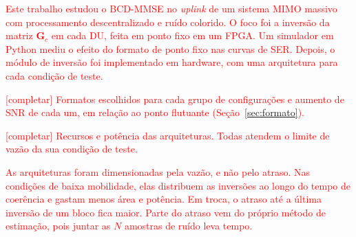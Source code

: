 
\textcolor{red}{Este trabalho estudou o BCD-MMSE no \textit{uplink} de um sistema MIMO massivo com processamento descentralizado e ruído colorido. O foco foi a inversão da matriz $\mathbf G_c$ em cada DU, feita em ponto fixo em um FPGA. Um simulador em Python mediu o efeito do formato de ponto fixo nas curvas de SER. Depois, o módulo de inversão foi implementado em hardware, com uma arquitetura para cada condição de teste.}

\textcolor{red}{[completar] Formatos escolhidos para cada grupo de configurações e aumento de SNR de cada um, em relação ao ponto flutuante (Seção~\ref{sec:formato}).}

\textcolor{red}{[completar] Recursos e potência das arquiteturas. Todas atendem o limite de vazão da sua condição de teste.}

\textcolor{red}{As arquiteturas foram dimensionadas pela vazão, e não pelo atraso. Nas condições de baixa mobilidade, elas distribuem as inversões ao longo do tempo de coerência e gastam menos área e potência. Em troca, o atraso até a última inversão de um bloco fica maior. Parte do atraso vem do próprio método de estimação, pois juntar as $N$ amostras de ruído leva tempo.}


